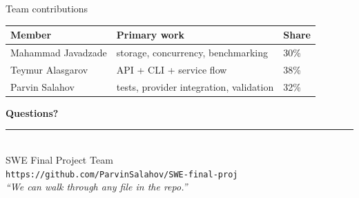 \documentclass[aspectratio=169,11pt]{beamer}
\newcommand{\teamname}{SWE Final Project Team}
\newcommand{\repolink}{https://github.com/ParvinSalahov/SWE-final-proj}
\begin{document}
\begin{frame}{Team contributions}
  \begin{center}\small
  \begin{tabularx}{\linewidth}{lXl}
    \toprule
    \textbf{Member} & \textbf{Primary work} & \textbf{Share} \\
    \midrule
    Mahammad Javadzade & storage, concurrency, benchmarking & 30\% \\
    Teymur Alasgarov & API + CLI + service flow & 38\% \\
    Parvin Salahov & tests, provider integration, validation & 32\% \\
    \bottomrule
  \end{tabularx}
  \end{center}
\end{frame}

{%
\begin{frame}[plain]
  \begin{center}
    \vspace{1cm}
    {\Huge\bfseries\color{accent} Questions?}\\[1.2em]
    \rule{0.5\textwidth}{0.6pt}\\[1.2em]
    {\large \teamname}\\[0.6em]
    {\normalsize \texttt{\repolink}}\\[1cm]
    {\footnotesize\itshape ``We can walk through any file in the repo.''}
  \end{center}
\end{frame}
}
\end{document}
